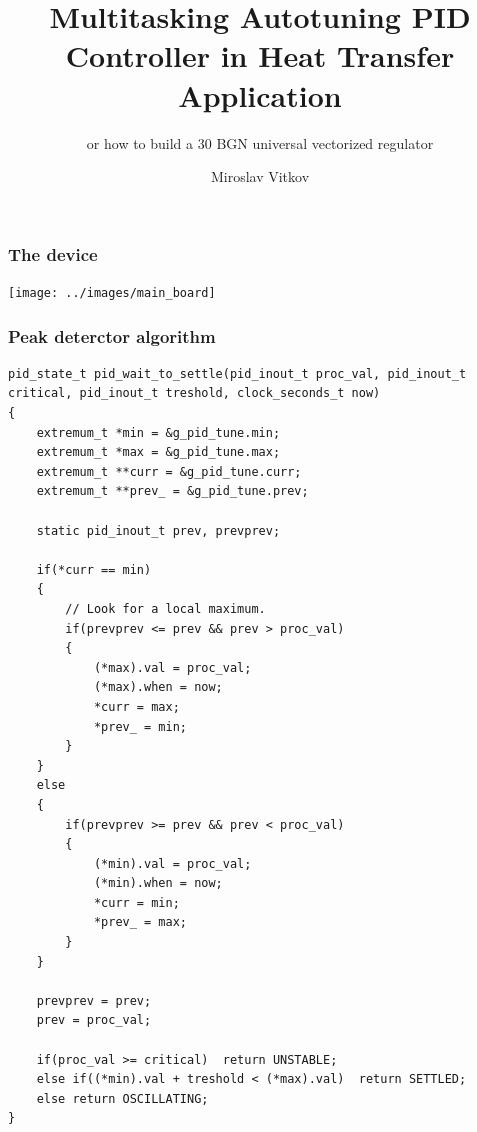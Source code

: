 \documentclass{beamer}
\title{Multitasking Autotuning PID Controller in Heat Transfer Application}
\subtitle{or how to build a 30 BGN universal vectorized regulator}
\author{Miroslav Vitkov}
\institute{ELDE, Technical University-Sofia}
\newlength\someheight
\begin{document}
\frame{\titlepage}


\begin{frame}
\frametitle{The device}
\texttt{[image: ../images/main\_board]}~
\end{frame}

\begin{frame}[fragile]
\frametitle{Peak deterctor algorithm}
\begin{adjustbox}{width=\textwidth,height=\someheight,keepaspectratio}
\begin{lstlisting}
pid_state_t pid_wait_to_settle(pid_inout_t proc_val, pid_inout_t critical, pid_inout_t treshold, clock_seconds_t now)
{
    extremum_t *min = &g_pid_tune.min;
    extremum_t *max = &g_pid_tune.max;
    extremum_t **curr = &g_pid_tune.curr;
    extremum_t **prev_ = &g_pid_tune.prev;

    static pid_inout_t prev, prevprev;

    if(*curr == min)
    {
        // Look for a local maximum.
        if(prevprev <= prev && prev > proc_val)
        {
            (*max).val = proc_val;
            (*max).when = now;
            *curr = max;
            *prev_ = min;
        }
    }
    else
    {
        if(prevprev >= prev && prev < proc_val)
        {
            (*min).val = proc_val;
            (*min).when = now;
            *curr = min;
            *prev_ = max;
        }
    }

    prevprev = prev;
    prev = proc_val;

    if(proc_val >= critical)  return UNSTABLE;
    else if((*min).val + treshold < (*max).val)  return SETTLED;
    else return OSCILLATING;
}
\end{lstlisting}
\end{adjustbox}
\end{frame}
\end{document}
